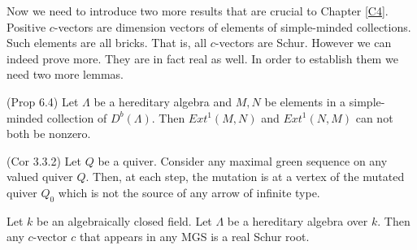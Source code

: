 \indent Now we need to introduce two more results that are crucial to Chapter \ref{C4}. Positive $c$-vectors are dimension vectors of elements of simple-minded collections. Such elements are all bricks. That is, all $c$-vectors are Schur. However we can indeed prove more. They are in fact real as well. In order to establish them we need two more lemmas.\\
\begin{lemma}
\cite{KQ15} (Prop 6.4)\label{KQ} Let $\Lambda$ be a hereditary algebra and $M,N$ be elements in a simple-minded collection of $D^b(\Lambda)$. Then $Ext^1(M,N)$ and $Ext^1(N,M)$ can not both be nonzero.
\end{lemma}
\begin{lemma}
\cite{BHIT15} (Cor 3.3.2) \label{BHIT} Let $Q$ be a quiver. Consider any maximal green sequence on any valued quiver $Q$. Then, at each step, the mutation is at a vertex of the mutated quiver $Q_0$ which is not the source of any arrow of infinite type.
\end{lemma}
\begin{lemma}
Let $k$ be an algebraically closed field. Let $\Lambda$ be a hereditary algebra over $k$. Then any $c$-vector $c$ that appears in any MGS is a real Schur root.
\end{lemma}
